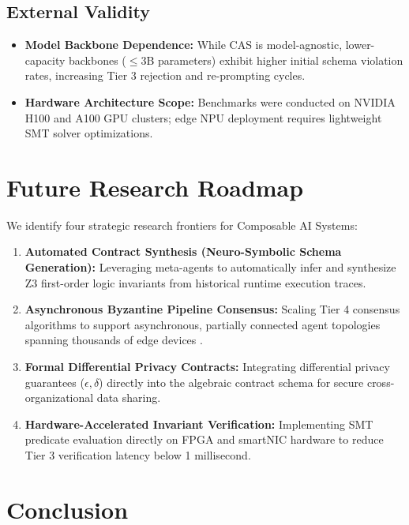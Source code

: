 \documentclass[10pt,twocolumn,letterpaper]{article}
\begin{document}
\subsection{External Validity}

\begin{itemize}
  \item \textbf{Model Backbone Dependence:} While CAS is model-agnostic, lower-capacity backbones ($\le 3$B parameters) exhibit higher initial schema violation rates, increasing Tier 3 rejection and re-prompting cycles.
  \item \textbf{Hardware Architecture Scope:} Benchmarks were conducted on NVIDIA H100 and A100 GPU clusters; edge NPU deployment requires lightweight SMT solver optimizations.
\end{itemize}




\section{Future Research Roadmap}


We identify four strategic research frontiers for Composable AI Systems:
\begin{enumerate}
  \item \textbf{Automated Contract Synthesis (Neuro-Symbolic Schema Generation):} Leveraging meta-agents to automatically infer and synthesize Z3 first-order logic invariants from historical runtime execution traces.
  \item \textbf{Asynchronous Byzantine Pipeline Consensus:} Scaling Tier 4 consensus algorithms to support asynchronous, partially connected agent topologies spanning thousands of edge devices \cite{crossref_10_1109_access_2026_3656309}.
  \item \textbf{Formal Differential Privacy Contracts:} Integrating differential privacy guarantees ($\epsilon, \delta$) directly into the algebraic contract schema for secure cross-organizational data sharing.
  \item \textbf{Hardware-Accelerated Invariant Verification:} Implementing SMT predicate evaluation directly on FPGA and smartNIC hardware to reduce Tier 3 verification latency below 1 millisecond.
\end{enumerate}




\section{Conclusion}
\end{document}
